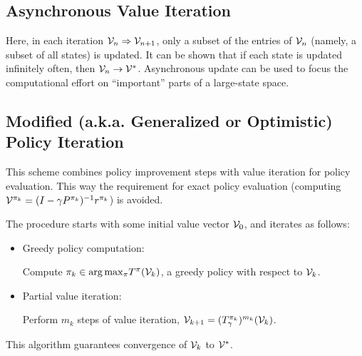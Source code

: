 \subsection{Asynchronous Value  Iteration}
Here, in each iteration ${\mathcal{V}_n} \Rightarrow {\mathcal{V}_{n + 1}}$,
only a subset of the entries of  ${\mathcal{V}_n}$ (namely, a subset of
all states) is updated. It can be shown that if each state is
updated infinitely often, then ${\mathcal{V}_n} \to {\mathcal{V}^*}$.
Asynchronous update can be used to focus the computational effort on
``important'' parts of a large-state space.



\subsection{Modified (a.k.a. Generalized or Optimistic) Policy Iteration}\label{ss:mod_PI}

This scheme combines policy improvement steps with value iteration
for policy evaluation. This way the requirement for exact policy
evaluation (computing  ${\mathcal{V}^{{\pi _k}}} = {(I - \gamma
{P^{{\pi_k}}})^{ - 1}}{r^{{\pi _k}}}$) is avoided.

The procedure starts with some initial value vector ${\mathcal{V}_0}$,
and iterates as follows:
\begin{itemize}
  \item Greedy policy computation:

Compute ${\pi _k} \in \arg {\max _\pi}T_{}^\pi
({\mathcal{V}_k})$, a greedy policy with respect to ${\mathcal{V}_k}$.
  \item Partial value iteration:

Perform ${m_k}$ steps of value iteration, ${\mathcal{V}_{k + 1}} =
{(T_\gamma ^{{\pi _k}})^{{m_k}}}({\mathcal{V}_k})$.
\end{itemize}

This algorithm guarantees convergence of ${\mathcal{V}_ k}$ to
${\mathcal{V}^*}$.



